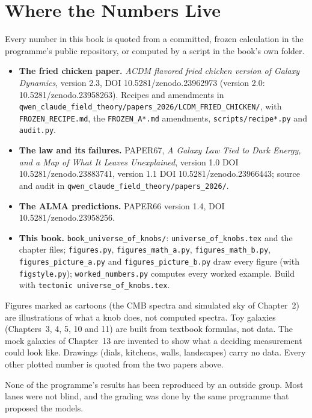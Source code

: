 \chapter{Where the Numbers Live}

Every number in this book is quoted from a committed, frozen calculation in the programme's public repository, or computed by a script in the book's own folder.

\begin{itemize}
\item \textbf{The fried chicken paper.} \emph{ACDM flavored fried chicken version of Galaxy Dynamics}, version 2.3, DOI 10.5281/zenodo.23962973 (version 2.0: 10.5281/zenodo.23958263). Recipes and amendments in \texttt{qwen\_claude\_field\_theory/papers\_2026/LCDM\_FRIED\_CHICKEN/}, with \texttt{FROZEN\_RECIPE.md}, the \texttt{FROZEN\_A*.md} amendments, \texttt{scripts/recipe*.py} and \texttt{audit.py}.
\item \textbf{The law and its failures.} PAPER67, \emph{A Galaxy Law Tied to Dark Energy, and a Map of What It Leaves Unexplained}, version 1.0 DOI 10.5281/zenodo.23883741, version 1.1 DOI 10.5281/zenodo.23966443; source and audit in \texttt{qwen\_claude\_field\_theory/papers\_2026/}.
\item \textbf{The ALMA predictions.} PAPER66 version 1.4, DOI 10.5281/zenodo.23958256.
\item \textbf{This book.} \texttt{book\_universe\_of\_knobs/}: \texttt{universe\_of\_knobs.tex} and the chapter files; \texttt{figures.py}, \texttt{figures\_math\_a.py}, \texttt{figures\_math\_b.py}, \texttt{figures\_picture\_a.py} and \texttt{figures\_picture\_b.py} draw every figure (with \texttt{figstyle.py}); \texttt{worked\_numbers.py} computes every worked example. Build with \texttt{tectonic universe\_of\_knobs.tex}.
\end{itemize}

Figures marked as cartoons (the CMB spectra and simulated sky of Chapter~2) are illustrations of what a knob does, not computed spectra. Toy galaxies (Chapters~3, 4, 5, 10 and 11) are built from textbook formulas, not data. The mock galaxies of Chapter~13 are invented to show what a deciding measurement could look like. Drawings (dials, kitchens, walls, landscapes) carry no data. Every other plotted number is quoted from the two papers above.

None of the programme's results has been reproduced by an outside group. Most lanes were not blind, and the grading was done by the same programme that proposed the models.
